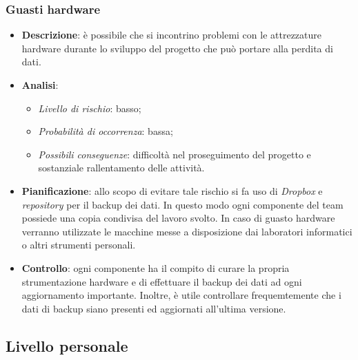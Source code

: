 		\subsubsection{Guasti hardware}
			\begin{itemize}
				\item \textbf{Descrizione}: è possibile che si incontrino problemi con le attrezzature hardware durante lo sviluppo del progetto che può portare alla perdita di dati.
				\item \textbf{Analisi}:
				\begin{itemize}
					\item \textit{Livello di rischio}: basso;
					\item \textit{Probabilità di occorrenza}: bassa;
					\item \textit{Possibili conseguenze}: difficoltà nel proseguimento del progetto e sostanziale rallentamento delle attività.
				\end{itemize}
				\item \textbf{Pianificazione}: allo scopo di evitare tale rischio si fa uso di \textit{Dropbox} e \textit{repository} per il backup dei dati. In questo modo ogni componente del team possiede una copia condivisa del lavoro svolto. In caso di guasto hardware verranno utilizzate le macchine messe a disposizione dai laboratori informatici o altri strumenti personali.
				\item \textbf{Controllo}: ogni componente ha il compito di curare la propria strumentazione hardware e di effettuare il backup dei dati ad ogni aggiornamento importante. Inoltre, è utile controllare frequemtemente che i dati di backup siano presenti ed aggiornati all'ultima versione.
			\end{itemize}
	\subsection{Livello personale}
